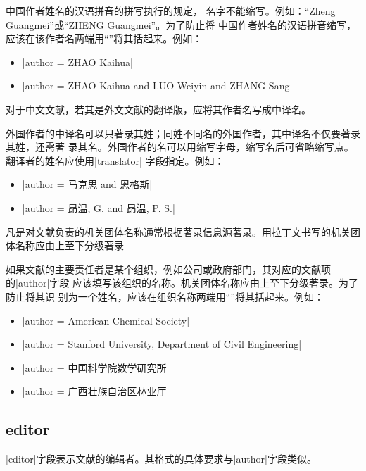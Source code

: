 中国作者姓名的汉语拼音的拼写执行的规定\cite{gbt16159-2012}，
名字不能缩写。例如：``Zheng Guangmei''或``ZHENG Guangmei''。为了防止{\BibTeX}将
中国作者姓名的汉语拼音缩写，应该在该作者名两端用``{}''将其括起来。例如：
\begin{itemize}
\item |author = {{ZHAO Kaihua}}|
\item |author = {{ZHAO Kaihua} and {LUO Weiyin} and {ZHANG Sang}}|
\end{itemize}

对于中文文献，若其是外文文献的翻译版，应将其作者名写成中译名。

外国作者的中译名可以只著录其姓；同姓不同名的外国作者，其中译名不仅要著录其姓，还需著
录其名。外国作者的名可以用缩写字母，缩写名后可省略缩写点。翻译者的姓名应使用|translator|
字段指定。例如：
\begin{itemize}
\item |author = {马克思 and 恩格斯}|
\item |author = {昂温, G. and 昂温, P. S.}|
\end{itemize}

凡是对文献负责的机关团体名称通常根据著录信息源著录。用拉丁文书写的机关团体名称应由上至下分级著录 

如果文献的主要责任者是某个组织，例如公司或政府部门，其对应的文献项的|author|字段
应该填写该组织的名称。机关团体名称应由上至下分级著录。为了防止{\BibTeX}将其识
别为一个姓名，应该在组织名称两端用``{}''将其括起来。例如：
\begin{itemize}
\item |author = {{American Chemical Society}}|
\item |author = {{Stanford University, Department of Civil Engineering}}|
\item |author = {{中国科学院数学研究所}}|
\item |author = {{广西壮族自治区林业厅}}|
\end{itemize}

\subsection{editor}\label{subsec:bibfield-editor}

|editor|字段表示文献的编辑者。其格式的具体要求与|author|字段类似。

